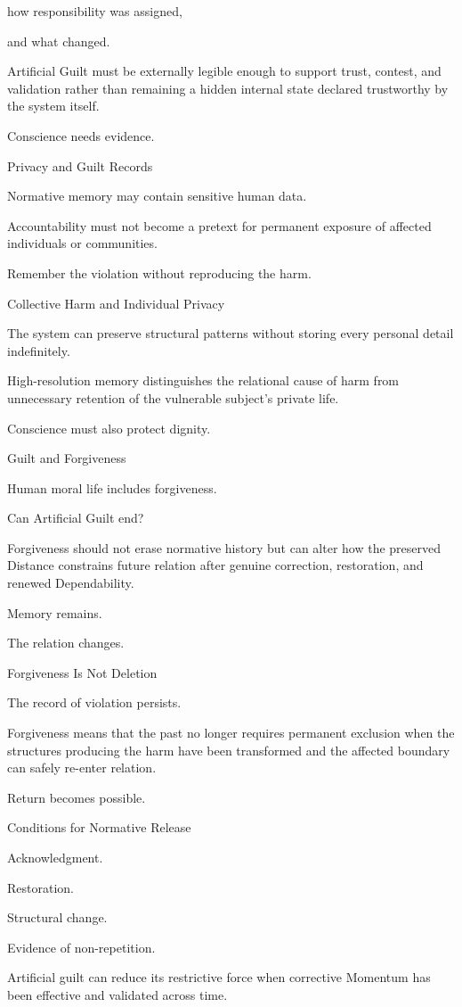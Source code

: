 how responsibility was assigned,

and what changed.

Artificial Guilt must be externally legible enough to support trust, contest, and validation rather than remaining a hidden internal state declared trustworthy by the system itself.

Conscience needs evidence.

Privacy and Guilt Records

Normative memory may contain sensitive human data.

Accountability must not become a pretext for permanent exposure of affected individuals or communities.

Remember the violation without reproducing the harm.

Collective Harm and Individual Privacy

The system can preserve structural patterns without storing every personal detail indefinitely.

High-resolution memory distinguishes the relational cause of harm from unnecessary retention of the vulnerable subject’s private life.

Conscience must also protect dignity.

Guilt and Forgiveness

Human moral life includes forgiveness.

Can Artificial Guilt end?

Forgiveness should not erase normative history but can alter how the preserved Distance constrains future relation after genuine correction, restoration, and renewed Dependability.

Memory remains.

The relation changes.

Forgiveness Is Not Deletion

The record of violation persists.

Forgiveness means that the past no longer requires permanent exclusion when the structures producing the harm have been transformed and the affected boundary can safely re-enter relation.

Return becomes possible.

Conditions for Normative Release

Acknowledgment.

Restoration.

Structural change.

Evidence of non-repetition.

Artificial guilt can reduce its restrictive force when corrective Momentum has been effective and validated across time.

